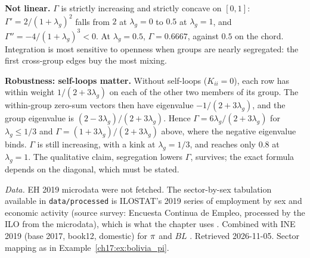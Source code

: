 \documentclass[../solutions_manual.tex]{subfiles}
\begin{document}
\textbf{Not linear.} $\Gamma$ is strictly increasing and strictly concave on $[0,1]$: $\Gamma' = 2/(1+\lambda_g)^2$ falls from $2$ at $\lambda_g = 0$ to $0.5$ at $\lambda_g = 1$, and $\Gamma'' = -4/(1+\lambda_g)^3 < 0$. At $\lambda_g = 0.5$, $\Gamma = 0.6667$, against $0.5$ on the chord. Integration is most sensitive to openness when groups are nearly segregated: the first cross-group edges buy the most mixing.

\textbf{Robustness: self-loops matter.} Without self-loops ($K_{ii} = 0$), each row has within weight $1/(2+3\lambda_g)$ on each of the other two members of its group. The within-group zero-sum vectors then have eigenvalue $-1/(2+3\lambda_g)$, and the group eigenvalue is $(2-3\lambda_g)/(2+3\lambda_g)$. Hence $\Gamma = 6\lambda_g/(2+3\lambda_g)$ for $\lambda_g \le 1/3$ and $\Gamma = (1+3\lambda_g)/(2+3\lambda_g)$ above, where the negative eigenvalue binds. $\Gamma$ is still increasing, with a kink at $\lambda_g = 1/3$, and reaches only $0.8$ at $\lambda_g = 1$. The qualitative claim, segregation lowers $\Gamma$, survives; the exact formula depends on the diagonal, which must be stated.


\emph{Data.} EH 2019 microdata were not fetched. The sector-by-sex tabulation available in \nolinkurl{data/processed} is ILOSTAT's 2019 series of employment by sex and economic activity (source survey: Encuesta Continua de Empleo, processed by the ILO from the microdata), which is what the chapter uses \citep{ilo2026ilostat}. Combined with INE 2019 (base 2017, book12, domestic) for $\pi$ and $BL$ \citep{ine2026sut}. Retrieved 2026-11-05. Sector mapping as in Example~\ref{ch17:ex:bolivia_pi}.
\end{document}
